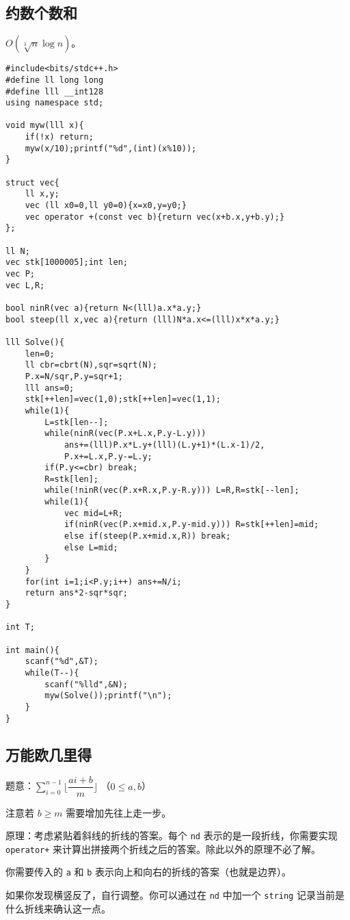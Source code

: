 \documentclass[12pt]{ctexart}
\begin{document}
\subsection{约数个数和}

$O(\sqrt[3]n\log n)$。

\begin{lstlisting}
#include<bits/stdc++.h>
#define ll long long
#define lll __int128
using namespace std;

void myw(lll x){
	if(!x) return;
	myw(x/10);printf("%d",(int)(x%10));
}

struct vec{
	ll x,y;
	vec (ll x0=0,ll y0=0){x=x0,y=y0;}
	vec operator +(const vec b){return vec(x+b.x,y+b.y);}
};

ll N;
vec stk[1000005];int len;
vec P;
vec L,R; 

bool ninR(vec a){return N<(lll)a.x*a.y;}
bool steep(ll x,vec a){return (lll)N*a.x<=(lll)x*x*a.y;}

lll Solve(){
	len=0;
	ll cbr=cbrt(N),sqr=sqrt(N);
	P.x=N/sqr,P.y=sqr+1;
	lll ans=0;
	stk[++len]=vec(1,0);stk[++len]=vec(1,1);
	while(1){
		L=stk[len--];
		while(ninR(vec(P.x+L.x,P.y-L.y)))
			ans+=(lll)P.x*L.y+(lll)(L.y+1)*(L.x-1)/2,
			P.x+=L.x,P.y-=L.y;
		if(P.y<=cbr) break;
		R=stk[len];
		while(!ninR(vec(P.x+R.x,P.y-R.y))) L=R,R=stk[--len];
		while(1){
			vec mid=L+R;
			if(ninR(vec(P.x+mid.x,P.y-mid.y))) R=stk[++len]=mid;
			else if(steep(P.x+mid.x,R)) break;
			else L=mid;
		}
	}
	for(int i=1;i<P.y;i++) ans+=N/i;
	return ans*2-sqr*sqr;
}

int T;

int main(){
	scanf("%d",&T);
	while(T--){
		scanf("%lld",&N);
		myw(Solve());printf("\n");
	}
}
\end{lstlisting}



\subsection{万能欧几里得}

题意：$\sum\limits_{i=0}^{n-1}\lfloor \dfrac {ai+b}m\rfloor$ （$0\le a,b$）

注意若 $b\ge m$ 需要增加先往上走一步。

原理：考虑紧贴着斜线的折线的答案。每个 \verb|nd| 表示的是一段折线，你需要实现 \verb|operator+| 来计算出拼接两个折线之后的答案。除此以外的原理不必了解。

你需要传入的 \verb|a| 和 \verb|b| 表示向上和向右的折线的答案（也就是边界）。

如果你发现横竖反了，自行调整。你可以通过在 \verb|nd| 中加一个 \verb|string| 记录当前是什么折线来确认这一点。
\end{document}
